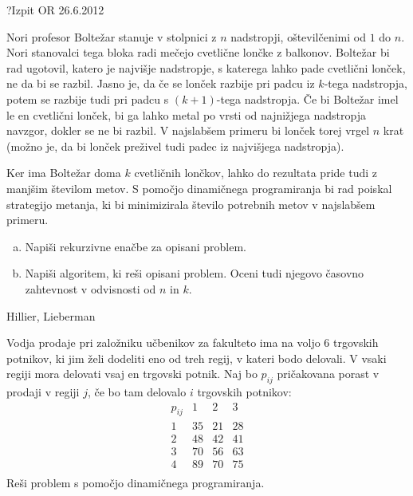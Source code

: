 \begin{naloga}{?}{Izpit OR 26.6.2012}
\begin{vprasanje}
Nori profesor Boltežar stanuje v stolpnici z $n$ nadstropji,
oštevilčenimi od $1$ do $n$.
Nori stanovalci tega bloka radi mečejo cvetlične lončke z balkonov.
Boltežar bi rad ugotovil, katero je najvišje nadstropje,
s katerega lahko pade cvetlični lonček, ne da bi se razbil.
Jasno je, da če se lonček razbije pri padcu iz $k$-tega nadstropja,
potem se razbije tudi pri padcu s $(k+1)$-tega nadstropja.
Če bi Boltežar imel le en cvetlični lonček,
bi ga lahko metal po vrsti od najnižjega nadstropja navzgor,
dokler se ne bi razbil.
V najslabšem primeru bi lonček torej vrgel $n$ krat
(možno je, da bi lonček preživel tudi padec iz najvišjega nadstropja).

Ker ima Boltežar doma $k$ cvetličnih lončkov,
lahko do rezultata pride tudi z manjšim številom metov.
S pomočjo dinamičnega programiranja bi rad po\-is\-kal strategijo metanja,
ki bi minimizirala število potrebnih metov v najslabšem primeru.
\begin{enumerate}[(a)]
\item Napiši rekurzivne enačbe za opisani problem.
\item Napiši algoritem, ki reši opisani problem.
Oceni tudi njegovo časovno zahtevnost v odvisnosti od $n$ in $k$.
\end{enumerate}

\end{vprasanje}
\begin{odgovor}
\end{odgovor}
\end{naloga}


\begin{naloga}{Hillier, Lieberman}{\cite[Problem~11.2-2]{hl}}
\begin{vprasanje}
Vodja prodaje pri založniku učbenikov za fakulteto
ima na voljo $6$ trgovskih potnikov,
ki jim želi dodeliti eno od treh regij, v kateri bodo delovali.
V vsaki regiji mora delovati vsaj en trgovski potnik.
Naj bo $p_{ij}$ pričakovana porast v prodaji v regiji $j$,
če bo tam delovalo $i$ trgovskih potnikov:
$$
\begin{array}{c|ccc}
p_{ij} & 1 & 2 & 3 \\
\hline
1 & 35 & 21 & 28 \\
2 & 48 & 42 & 41 \\
3 & 70 & 56 & 63 \\
4 & 89 & 70 & 75 \\
\end{array}
$$
Reši problem s pomočjo dinamičnega programiranja.

\end{vprasanje}
\begin{odgovor}
\end{odgovor}
\end{naloga}



